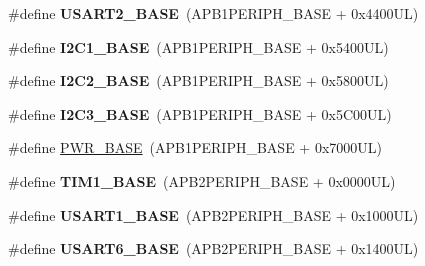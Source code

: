 \begin{DoxyCompactItemize}
\item 
\mbox{\label{group___peripheral__memory__map_gade83162a04bca0b15b39018a8e8ec090}} 
\#define {\bfseries U\+S\+A\+R\+T2\+\_\+\+B\+A\+SE}~(A\+P\+B1\+P\+E\+R\+I\+P\+H\+\_\+\+B\+A\+SE + 0x4400\+U\+L)
\item 
\mbox{\label{group___peripheral__memory__map_gacd72dbffb1738ca87c838545c4eb85a3}} 
\#define {\bfseries I2\+C1\+\_\+\+B\+A\+SE}~(A\+P\+B1\+P\+E\+R\+I\+P\+H\+\_\+\+B\+A\+SE + 0x5400\+U\+L)
\item 
\mbox{\label{group___peripheral__memory__map_ga04bda70f25c795fb79f163b633ad4a5d}} 
\#define {\bfseries I2\+C2\+\_\+\+B\+A\+SE}~(A\+P\+B1\+P\+E\+R\+I\+P\+H\+\_\+\+B\+A\+SE + 0x5800\+U\+L)
\item 
\mbox{\label{group___peripheral__memory__map_ga4e8b9198748235a1729e1e8f8f24983b}} 
\#define {\bfseries I2\+C3\+\_\+\+B\+A\+SE}~(A\+P\+B1\+P\+E\+R\+I\+P\+H\+\_\+\+B\+A\+SE + 0x5\+C00\+U\+L)
\item 
\#define \hyperlink{group___peripheral__memory__map_gac691ec23dace8b7a649a25acb110217a}{P\+W\+R\+\_\+\+B\+A\+SE}~(A\+P\+B1\+P\+E\+R\+I\+P\+H\+\_\+\+B\+A\+SE + 0x7000\+U\+L)
\item 
\mbox{\label{group___peripheral__memory__map_gaf8aa324ca5011b8173ab16585ed7324a}} 
\#define {\bfseries T\+I\+M1\+\_\+\+B\+A\+SE}~(A\+P\+B2\+P\+E\+R\+I\+P\+H\+\_\+\+B\+A\+SE + 0x0000\+U\+L)
\item 
\mbox{\label{group___peripheral__memory__map_ga86162ab3f740db9026c1320d46938b4d}} 
\#define {\bfseries U\+S\+A\+R\+T1\+\_\+\+B\+A\+SE}~(A\+P\+B2\+P\+E\+R\+I\+P\+H\+\_\+\+B\+A\+SE + 0x1000\+U\+L)
\item 
\mbox{\label{group___peripheral__memory__map_gade4d3907fd0387ee832f426f52d568bb}} 
\#define {\bfseries U\+S\+A\+R\+T6\+\_\+\+B\+A\+SE}~(A\+P\+B2\+P\+E\+R\+I\+P\+H\+\_\+\+B\+A\+SE + 0x1400\+U\+L)
\item 
\mbox{\label{group___peripheral__memory__map_ga695c9a2f892363a1c942405c8d351b91}} 

\end{DoxyCompactItemize}
